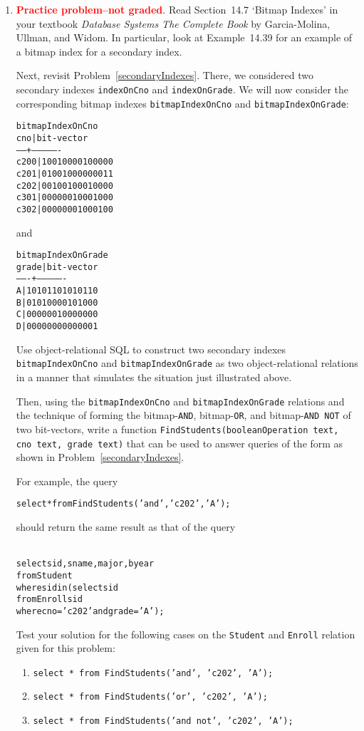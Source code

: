 \documentclass{article}
\newcommand{\blue}[1]{{\color{blue}#1}}
\begin{document}
\begin{enumerate}[resume]
\item \textcolor{red}{\bf Practice problem--not graded}.
Read Section~14.7 `Bitmap Indexes' in your textbook \emph{Database Systems The Complete Book} by Garcia-Molina, Ullman, and Widom.   In particular, look at Example~14.39 for an example of a bitmap index for a secondary index.

Next, revisit Problem~\ref{secondaryIndexes}.   There, we considered two secondary indexes {\tt indexOnCno} and
{\tt indexOnGrade}.  We will now consider the corresponding bitmap indexes
{\tt bitmapIndexOnCno} and {\tt bitmapIndexOnGrade}:

{\footnotesize
\begin{alltt}
bitmapIndexOnCno
 cno  |     bit-vector     
------+----------------
 c200 | 10010000100000
 c201 | 01001000000011
 c202 | 00100100010000
 c301 | 00000010001000
 c302 | 00000001000100
\end{alltt}}
and
{\footnotesize
\begin{alltt}
bitmapIndexOnGrade
 grade |     bit-vector     
-------+----------------
 A     | 10101101010110
 B     | 01010000101000
 C     | 00000010000000
 D     | 00000000000001
\end{alltt}}

Use object-relational SQL to construct two secondary indexes {\tt bitmapIndexOnCno} and {\tt bitmapIndexOnGrade} as
two object-relational relations in a manner that simulates the situation just illustrated above.

Then, using the {\tt bitmapIndexOnCno} and {\tt bitmapIndexOnGrade} relations and the technique of forming the bitmap-{\tt AND}, bitmap-{\tt OR}, and bitmap-{\tt AND NOT} of two bit-vectors,  write a function 
{\tt FindStudents(booleanOperation text, cno text, grade text)} that can be used to answer queries of the form as shown in Problem~\ref{secondaryIndexes}.

For example, the query
{\footnotesize
\begin{alltt}
\blue{select * from FindStudents('and', 'c202', 'A');}
\end{alltt}}
should return the same result as that of the query
{\footnotesize
\begin{alltt}{\blue{
select sid, sname, major, byear 
from   Student 
where  sid in (select sid
               from   Enroll sid
               where  cno = 'c202' and grade = 'A');}}
\end{alltt}  
}


Test your solution for the following cases on the {\tt Student} and {\tt Enroll} relation given for this problem:
\begin{enumerate}
\item {\tt select * from FindStudents('and', 'c202', 'A');}
\item {\tt select * from FindStudents('or', 'c202', 'A');}
\item {\tt select * from FindStudents('and not', 'c202', 'A');}
\end{enumerate}
\end{enumerate}
\end{document}
